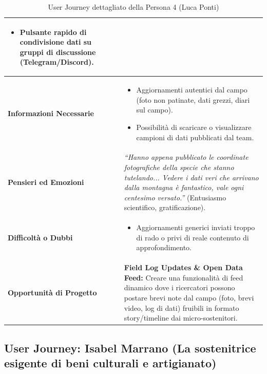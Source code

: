 \documentclass[11pt,a4paper]{article}
\begin{document}
\begin{table}[h!]
\begin{tabular}{|p{3.2cm}|p{11.8cm}|}
\begin{itemize}[leftmargin=*,nosep]
    \item Pulsante rapido di condivisione dati su gruppi di discussione (Telegram/Discord).
\end{itemize} \\ \hline
\textbf{Informazioni Necessarie} &
\begin{itemize}[leftmargin=*,nosep]
    \item Aggiornamenti autentici dal campo (foto non patinate, dati grezzi, diari sul campo).
    \item Possibilità di scaricare o visualizzare campioni di dati pubblicati dal team.
\end{itemize} \\ \hline
\textbf{Pensieri ed Emozioni} &
\textit{``Hanno appena pubblicato le coordinate fotografiche della specie che stanno tutelando... Vedere i dati veri che arrivano dalla montagna è fantastico, vale ogni centesimo versato.''} (Entusiasmo scientifico, gratificazione). \\ \hline
\textbf{Difficoltà o Dubbi} &
\begin{itemize}[leftmargin=*,nosep]
    \item Aggiornamenti generici inviati troppo di rado o privi di reale contenuto di approfondimento.
\end{itemize} \\ \hline
\textbf{Opportunità di Progetto} &
\textbf{Field Log Updates \& Open Data Feed:} Creare una funzionalità di feed dinamico dove i ricercatori possono postare brevi note dal campo (foto, brevi video, log di dati) fruibili in formato story/timeline dai micro-sostenitori. \\ \hline
\end{tabular}
\caption{User Journey dettagliato della Persona 4 (Luca Ponti)}
\label{tab:user_journey_luca}
\end{table}


\subsection{User Journey: Isabel Marrano (La sostenitrice esigente di beni culturali e artigianato)}
\end{document}
